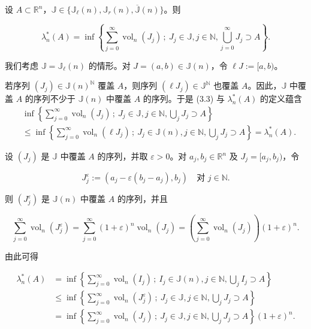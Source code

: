 \begin{proposition}

设 $ A \subset \mathbb{R}^n $，$ \mathbb{J} \in \{ \mathbb{J}_\ell(n), \mathbb{J}_r(n), \overline{\mathbb{J}}(n) \} $。则

\[
\lambda_n^*(A) = \inf\left\{ \sum_{j=0}^{\infty} \operatorname{vol}_n(J_j) \,;\ J_j \in \mathbb{J}, j \in \mathbb{N}, \bigcup_{j=0}^{\infty} J_j \supset A \right\} .
\]

\proofhead
我们考虑 $ \mathbb{J} = \mathbb{J}_\ell(n) $ 的情形。对 $ J = (a, b) \in \mathbb{J}(n) $，令 $ \ell J := [a, b) $。

若序列 $ (J_j) \in \mathbb{J}(n)^{\mathbb{N}} $ 覆盖 $ A $，则序列 $ (\ell J_j) \in \mathbb{J}^{\mathbb{N}} $ 也覆盖 $ A $。因此，$ \mathbb{J} $ 中覆盖 $ A $ 的序列不少于 $ \mathbb{J}(n) $ 中覆盖 $ A $ 的序列。于是 (3.3) 与 $ \lambda_n^*(A) $ 的定义蕴含
\begin{equation}
\begin{aligned}
& \inf\left\{ \sum_{j=0}^{\infty} \operatorname{vol}_n(J_j) \,;\ J_j \in \mathbb{J}, j \in \mathbb{N}, \bigcup_j J_j \supset A \right\} \\ & \le \inf\left\{ \sum_{j=0}^{\infty} \operatorname{vol}_n(\ell J_j) \,;\ J_j \in \mathbb{J}(n), j \in \mathbb{N}, \bigcup_j J_j \supset A \right\} = \lambda_n^*(A) .
\end{aligned}\tag{3.4}
\end{equation}

设 $ (J_j) $ 是 $ \mathbb{J} $ 中覆盖 $ A $ 的序列，并取 $ \varepsilon > 0 $。对 $ a_j, b_j \in \mathbb{R}^n $ 及 $ J_j = [a_j, b_j) $，令

\[
J_j^{\varepsilon} := (a_j - \varepsilon(b_j - a_j), b_j) \quad \text{对 } j \in \mathbb{N} .
\]

则 $ (J_j^{\varepsilon}) $ 是 $ \mathbb{J}(n) $ 中覆盖 $ A $ 的序列，并且

\[
\sum_{j=0}^{\infty} \operatorname{vol}_n(J_j^{\varepsilon}) = \sum_{j=0}^{\infty} (1+\varepsilon)^n \operatorname{vol}_n(J_j) = \left( \sum_{j=0}^{\infty} \operatorname{vol}_n(J_j) \right)(1+\varepsilon)^n .
\]

由此可得

\begin{equation*}
\begin{aligned}
\lambda_n^*(A) &= \inf\left\{ \sum_{j=0}^{\infty} \operatorname{vol}_n(I_j) \,;\ I_j \in \mathbb{J}(n), j \in \mathbb{N}, \bigcup_j I_j \supset A \right\} \\ &\le \inf\left\{ \sum_{j=0}^{\infty} \operatorname{vol}_n(J_j^{\varepsilon}) \,;\ J_j \in \mathbb{J}, j \in \mathbb{N}, \bigcup_j J_j \supset A \right\} \\ &= \inf\left\{ \sum_{j=0}^{\infty} \operatorname{vol}_n(J_j) \,;\ J_j \in \mathbb{J}, j \in \mathbb{N}, \bigcup_j J_j \supset A \right\}(1+\varepsilon)^n .
\end{aligned}
\end{equation*}


\end{proposition}
